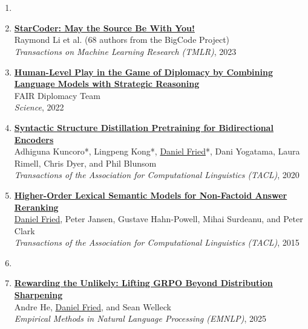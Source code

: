 \section{}

\begin{enumerate}[leftmargin=-1mm,partopsep=0pt]

\item[]

\item \href{https://arxiv.org/abs/2305.06161}{\textbf{StarCoder: May the Source Be With You!}} \\
  Raymond Li et al. (68 authors from the BigCode Project)\\
  \emph{Transactions on Machine Learning Research (TMLR)}, 2023

\item \href{https://www.science.org/doi/10.1126/science.ade9097}{\textbf{Human-Level Play in the Game of Diplomacy by Combining Language Models with Strategic Reasoning}} \\
  FAIR Diplomacy Team\\
  \emph{Science}, 2022

\item \href{https://www.mitpressjournals.org/doi/full/10.1162/tacl_a_00345}{\textbf{Syntactic Structure Distillation Pretraining for Bidirectional Encoders}} \\
  Adhiguna Kuncoro*, Lingpeng Kong*, \underline{Daniel Fried}*, Dani Yogatama, Laura Rimell, Chris Dyer, and Phil Blunsom\\
  \emph{Transactions of the Association for Computational Linguistics (TACL)}, 2020

\item \href{https://people.eecs.berkeley.edu/~dfried/papers/tacl2015-qa.pdf}{\textbf{Higher-Order Lexical Semantic Models for Non-Factoid Answer Reranking}} \\
  \underline{Daniel Fried}, Peter Jansen, Gustave Hahn-Powell, Mihai Surdeanu, and Peter Clark\\
  \emph{Transactions of the Association for Computational Linguistics (TACL)}, 2015

\item[]

\item \href{https://arxiv.org/abs/2506.02355}{\textbf{Rewarding the Unlikely: Lifting GRPO Beyond Distribution Sharpening}} \\
  Andre He, \underline{Daniel Fried}, and Sean Welleck\\
  \emph{Empirical Methods in Natural Language Processing (EMNLP)}, 2025


\end{enumerate}
